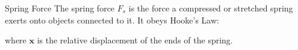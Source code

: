 \documentclass[12pt,compress,aspectratio=169]{beamer}
\begin{document}
\begin{frame}{Spring Force}
  The spring force $F_s$ is the force a compressed or stretched spring
  exerts onto objects connected to it. It obeys Hooke's Law:
  
  where $\bm x$ is the relative displacement of the ends of the spring.
  \begin{center}
  \end{center}
\end{frame}


%
%
%
\end{document}
